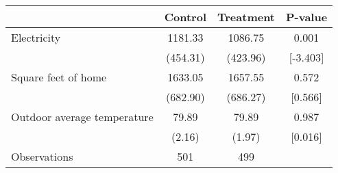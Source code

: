 \begin{tabular}{lccc}
\toprule
{} &   Control & Treatment &   P-value \\
\midrule
Electricity                 &   1181.33 &   1086.75 &     0.001 \\
                            &  (454.31) &  (423.96) &  [-3.403] \\
Square feet of home         &   1633.05 &   1657.55 &     0.572 \\
                            &  (682.90) &  (686.27) &   [0.566] \\
Outdoor average temperature &     79.89 &     79.89 &     0.987 \\
                            &    (2.16) &    (1.97) &   [0.016] \\
Observations                &       501 &       499 &           \\
\bottomrule
\end{tabular}
